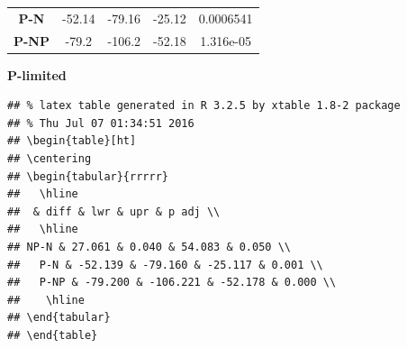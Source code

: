 \documentclass[]{article}
\begin{document}
\begin{longtable}[]{@{}ccccc@{}}
\begin{minipage}[t]{0.13\columnwidth}\centering\strut
\textbf{P-N}
\strut\end{minipage} &
\begin{minipage}[t]{0.08\columnwidth}\centering\strut
-52.14
\strut\end{minipage} &
\begin{minipage}[t]{0.10\columnwidth}\centering\strut
-79.16
\strut\end{minipage} &
\begin{minipage}[t]{0.08\columnwidth}\centering\strut
-25.12
\strut\end{minipage} &
\begin{minipage}[t]{0.11\columnwidth}\centering\strut
0.0006541
\strut\end{minipage}\tabularnewline
\begin{minipage}[t]{0.13\columnwidth}\centering\strut
\textbf{P-NP}
\strut\end{minipage} &
\begin{minipage}[t]{0.08\columnwidth}\centering\strut
-79.2
\strut\end{minipage} &
\begin{minipage}[t]{0.10\columnwidth}\centering\strut
-106.2
\strut\end{minipage} &
\begin{minipage}[t]{0.08\columnwidth}\centering\strut
-52.18
\strut\end{minipage} &
\begin{minipage}[t]{0.11\columnwidth}\centering\strut
1.316e-05
\strut\end{minipage}\tabularnewline
\bottomrule
\end{longtable}

\textbf{P-limited}

\begin{verbatim}
## % latex table generated in R 3.2.5 by xtable 1.8-2 package
## % Thu Jul 07 01:34:51 2016
## \begin{table}[ht]
## \centering
## \begin{tabular}{rrrrr}
##   \hline
##  & diff & lwr & upr & p adj \\ 
##   \hline
## NP-N & 27.061 & 0.040 & 54.083 & 0.050 \\ 
##   P-N & -52.139 & -79.160 & -25.117 & 0.001 \\ 
##   P-NP & -79.200 & -106.221 & -52.178 & 0.000 \\ 
##    \hline
## \end{tabular}
## \end{table}
\end{verbatim}
\end{document}
